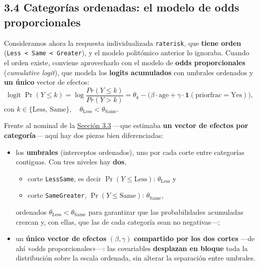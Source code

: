 \documentclass[
  letterpaper,
  DIV=11,
  numbers=noendperiod]{scrartcl}
\providecommand{\tightlist}{%
  \setlength{\itemsep}{0pt}\setlength{\parskip}{0pt}}\usepackage{longtable,booktabs,array}
\begin{document}
\hypertarget{sec-u13-ordinal}{%
\subsection{3.4 Categorías ordenadas: el modelo de odds
proporcionales}\label{sec-u13-ordinal}}

Consideramos ahora la respuesta individualizada \texttt{raterisk}, que
\textbf{tiene orden}
(\texttt{Less\ \textless{}\ Same\ \textless{}\ Greater}), y el modelo
politómico anterior lo ignoraba. Cuando el orden existe, conviene
aprovecharlo con el modelo de \textbf{odds proporcionales}
(\emph{cumulative logit}), que modela los \textbf{logits acumulados} con
umbrales ordenados y \textbf{un único} vector de efectos: \[
\operatorname{logit}\Pr(Y\le k)= \operatorname{log}\frac{Pr(Y\le k)}{Pr(Y> k)}=\theta_k-\bigl(\beta \cdot\text{age}+\gamma \cdot \mathbf1(\text{priorfrac}=\text{Yes})\bigr),
\] con
\(k\in\{\text{Less},\,\text{Same}\},\quad \theta_{\text{Less}}<\theta_{\text{Same}}\).

Frente al nominal de la \protect\hyperlink{sec-u13-nominal}{Sección 3.3}
---que estimaba \textbf{un vector de efectos por categoría}--- aquí hay
dos piezas bien diferenciadas:

\begin{itemize}
\item
  los \textbf{umbrales} (interceptos ordenados), uno por cada corte
  entre categorías contiguas. Con tres niveles hay \textbf{dos},

  \begin{itemize}
  \tightlist
  \item
    corte \texttt{Less\textbar{}Same}, es decir
    \(\Pr(Y\le\text{Less})\): \(\theta_{\text{Less}}\) y
  \item
    corte \texttt{Same\textbar{}Greater}, \(\Pr(Y\le\text{Same})\):
    \(\theta_{\text{Same}}\),
  \end{itemize}

  ordenados \(\theta_{\text{Less}}<\theta_{\text{Same}}\) para
  garantizar que las probabilidades acumuladas crezcan y, con ellas, que
  las de cada categoría sean no negativas---;
\item
  un \textbf{único vector de efectos} \((\beta,\gamma)\)
  \textbf{compartido por los dos cortes} ---de ahí «odds
  proporcionales»---: las covariables \textbf{desplazan en bloque} toda
  la distribución sobre la escala ordenada, sin alterar la separación
  entre umbrales.
\end{itemize}
\end{document}

